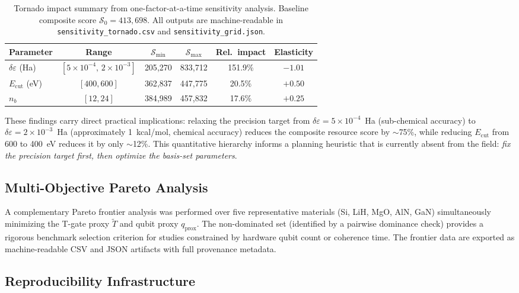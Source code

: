 \documentclass[11pt]{article}
\newcommand{\de}{\delta\varepsilon}
\newcommand{\Ecut}{E_{\mathrm{cut}}{}}
\newcommand{\nb}{{n_b}}
\newcommand{\tgate}{\widetilde{T}}
\newcommand{\qprox}{q_{\mathrm{prox}}}
\newcommand{\score}{\mathcal{S}}
\begin{document}
\begin{table}[h!]
\centering
\caption{Tornado impact summary from one-factor-at-a-time sensitivity
analysis. Baseline composite score $\score_0 = 413{,}698$.
All outputs are machine-readable in \texttt{sensitivity\_tornado.csv}
and \texttt{sensitivity\_grid.json}.}
\label{tab:tornado}
\small
\begin{tabular}{lccccc}
\toprule
Parameter & Range & $\score_{\min}$ & $\score_{\max}$
          & Rel.\ impact & Elasticity\\
\midrule
$\de$ (Ha) & $[5\!\times\!10^{-4},\,2\!\times\!10^{-3}]$
            & 205{,}270 & 833{,}712 & 151.9\% & $-1.01$\\
$\Ecut$ (eV) & $[400, 600]$
            & 362{,}837 & 447{,}775 & 20.5\% & $+0.50$\\
$\nb$ & $[12, 24]$
            & 384{,}989 & 457{,}832 & 17.6\% & $+0.25$\\
\bottomrule
\end{tabular}
\end{table}

These findings carry direct practical implications:
relaxing the precision target from $\de = 5 \times 10^{-4}$~Ha
(sub-chemical accuracy) to $\de = 2 \times 10^{-3}$~Ha (approximately
1~kcal/mol, chemical accuracy) reduces the composite resource score
by $\sim$75\%, while reducing $\Ecut$ from 600 to 400~eV reduces it
by only $\sim$12\%.
This quantitative hierarchy informs a planning heuristic that is currently
absent from the field: \emph{fix the precision target first, then
optimize the basis-set parameters}.

\subsection{Multi-Objective Pareto Analysis}

A complementary Pareto frontier analysis was performed over five
representative materials (Si, LiH, MgO, AlN, GaN) simultaneously
minimizing the T-gate proxy $\tgate$ and qubit proxy $\qprox$.
The non-dominated set (identified by a pairwise dominance check) provides
a rigorous benchmark selection criterion for studies constrained by
hardware qubit count or coherence time.
The frontier data are exported as machine-readable CSV and JSON artifacts
with full provenance metadata.

\subsection{Reproducibility Infrastructure}
\end{document}
